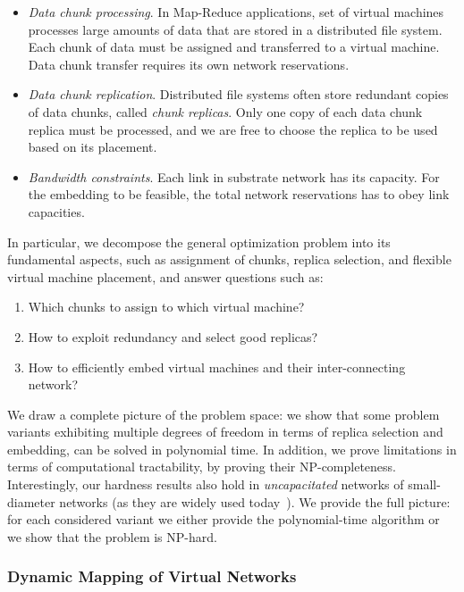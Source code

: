 \begin{itemize}
\item \emph{Data chunk processing}. In Map-Reduce applications, set of virtual machines processes large amounts of data that are stored in a distributed file system. Each chunk of data must be assigned and transferred to a virtual machine. Data chunk transfer requires its own network reservations.

\item \emph{Data chunk replication}. Distributed file systems often store redundant copies of data chunks, called \emph{chunk replicas}. Only one copy of each data chunk replica must be processed, and we are free to choose the replica to be used based on its placement.

\item \emph{Bandwidth constraints}. Each link in substrate network has its capacity. For the embedding to be feasible, the total network reservations has to obey link capacities.
\end{itemize}


In particular, we decompose the general optimization problem into its fundamental aspects, such as
assignment of chunks, replica selection, and flexible virtual machine
placement, and answer questions such as:
\begin{enumerate}
\item Which chunks to assign to which virtual machine?

\item How to exploit redundancy and select good replicas?

\item How to efficiently embed virtual machines and their inter-connecting network?

\end{enumerate}

We draw a complete picture of the problem space: we show that
some problem variants exhibiting multiple degrees of freedom in terms of
replica selection and embedding,
can be solved in polynomial time. In addition, we prove limitations in terms of
computational tractability, by proving their NP-completeness. Interestingly,
our hardness results also hold in \emph{uncapacitated}
networks of small-diameter networks (as they are
widely used today~\cite{fattree}).
We provide the full picture: for each considered variant we either provide the polynomial-time algorithm or we show that the problem is NP-hard.


\subsubsection{Dynamic Mapping of Virtual Networks}
\label{sec:contributions-dynamic-mapping}

